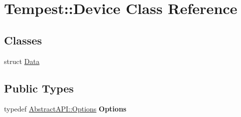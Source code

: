 \hypertarget{class_tempest_1_1_device}{\section{Tempest\+:\+:Device Class Reference}
\label{class_tempest_1_1_device}
}
\subsection*{Classes}
\begin{DoxyCompactItemize}
\item 
struct \hyperlink{struct_device_1_1_data}{Data}
\end{DoxyCompactItemize}
\subsection*{Public Types}
\begin{DoxyCompactItemize}
\item 
\hypertarget{class_tempest_1_1_device_aca6399ffb5858fe58e76e015f24908b9}{typedef \hyperlink{struct_tempest_1_1_abstract_a_p_i_1_1_options}{Abstract\+A\+P\+I\+::\+Options} {\bfseries Options}}\label{class_tempest_1_1_device_aca6399ffb5858fe58e76e015f24908b9}

\end{DoxyCompactItemize}
